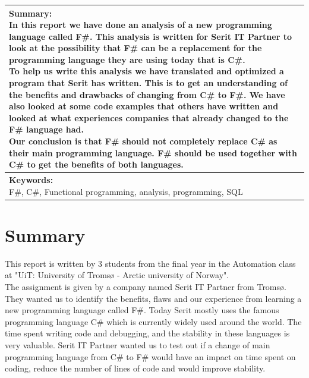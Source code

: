\documentclass[12pt, a4paper]{article}
\begin{document}
\begin{tabularx}{\textwidth}{|X|}
\hline
\pbox{\linewidth}{
\vspace{1mm}
\textbf{Summary:}\\
In this report we have done an analysis of a new programming language called F\#. This analysis is written for Serit IT Partner to look at the possibility that F\# can be a replacement for the programming language they are using today that is C\#.\\[2mm]
To help us write this analysis we have translated and optimized a program that Serit has written. This is to get an understanding of the benefits and drawbacks of changing from C\# to F\#. We have also looked at some code examples that others have written and looked at what experiences  companies that already changed to the F\# language had.\\[2mm]
Our conclusion is that F\# should not completely replace C\# as their main programming language. F\# should be used together with C\# to get the benefits of both languages. 
\vspace{1mm}
}
\\
\hline
\pbox{\linewidth}{
\vspace{1mm}
\textbf{Keywords:}\\
F\#, C\#, Functional programming, analysis, programming, SQL
\vspace{1mm}
}
\\

\hline
\end{tabularx}


\newpage
\section*{Summary}
This report is written by 3 students from the final year in the Automation class at "UiT: University of Tromsø - Arctic university of Norway".\\

The assignment is given by a company named Serit IT Partner from Tromsø. They wanted us to identify the benefits, flaws and our experience from learning a new programming language called F\#. Today Serit mostly uses the famous programming language C\# which is currently widely used around the world. The time spent writing code and debugging, and the stability in these languages is very valuable. Serit IT Partner wanted us to test out if a change of main programming language from C\# to F\# would have an impact on time spent on coding, reduce the number of lines of code and would improve stability.\\
\end{document}
